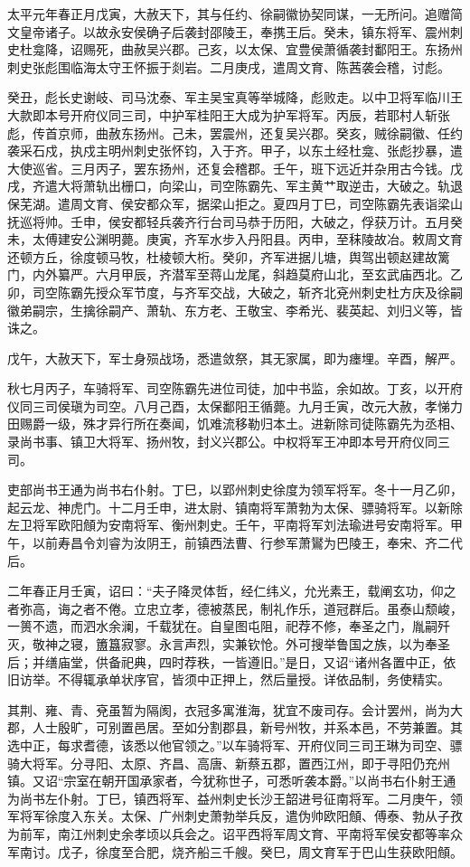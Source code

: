 \documentclass[12pt,UTF8]{ctexbook}
\begin{document}
太平元年春正月戊寅，大赦天下，其与任约、徐嗣徽协契同谋，一无所问。追赠简文皇帝诸子。以故永安侯确子后袭封邵陵王，奉携王后。癸未，镇东将军、震州刺史杜龛降，诏赐死，曲赦吴兴郡。己亥，以太保、宜豊侯萧循袭封鄱阳王。东扬州刺史张彪围临海太守王怀振于剡岩。二月庚戌，遣周文育、陈茜袭会稽，讨彪。

癸丑，彪长史谢岐、司马沈泰、军主吴宝真等举城降，彪败走。以中卫将军临川王大款即本号开府仪同三司，中护军桂阳王大成为护军将军。丙辰，若耶村人斩张彪，传首京师，曲赦东扬州。己未，罢震州，还复吴兴郡。癸亥，贼徐嗣徽、任约袭采石戍，执戍主明州刺史张怀钧，入于齐。甲子，以东土经杜龛、张彪抄暴，遣大使巡省。三月丙子，罢东扬州，还复会稽郡。壬午，班下远近并杂用古今钱。戊戌，齐遣大将萧轨出栅口，向梁山，司空陈霸先、军主黄{艹取}逆击，大破之。轨退保芜湖。遣周文育、侯安都众军，据梁山拒之。夏四月丁巳，司空陈霸先表诣梁山抚巡将帅。壬申，侯安都轻兵袭齐行台司马恭于历阳，大破之，俘获万计。五月癸未，太傅建安公渊明薨。庚寅，齐军水步入丹阳县。丙申，至秣陵故冶。敕周文育还顿方丘，徐度顿马牧，杜棱顿大桁。癸卯，齐军进据儿塘，舆驾出顿赵建故篱门，内外纂严。六月甲辰，齐潜军至蒋山龙尾，斜趋莫府山北，至玄武庙西北。乙卯，司空陈霸先授众军节度，与齐军交战，大破之，斩齐北兗州刺史杜方庆及徐嗣徽弟嗣宗，生擒徐嗣产、萧轨、东方老、王敬宝、李希光、裴英起、刘归义等，皆诛之。

戊午，大赦天下，军士身殒战场，悉遣敛祭，其无家属，即为瘗埋。辛酉，解严。

秋七月丙子，车骑将军、司空陈霸先进位司徒，加中书监，余如故。丁亥，以开府仪同三司侯瑱为司空。八月己酉，太保鄱阳王循薨。九月壬寅，改元大赦，孝悌力田赐爵一级，殊才异行所在奏闻，饥难流移勒归本土。进新除司徒陈霸先为丞相、录尚书事、镇卫大将军、扬州牧，封义兴郡公。中权将军王冲即本号开府仪同三司。

吏部尚书王通为尚书右仆射。丁巳，以郢州刺史徐度为领军将军。冬十一月乙卯，起云龙、神虎门。十二月壬申，进太尉、镇南将军萧勃为太保、骠骑将军。以新除左卫将军欧阳頠为安南将军、衡州刺史。壬午，平南将军刘法瑜进号安南将军。甲午，以前寿昌令刘睿为汝阴王，前镇西法曹、行参军萧鸑为巴陵王，奉宋、齐二代后。

二年春正月壬寅，诏曰：“夫子降灵体哲，经仁纬义，允光素王，载阐玄功，仰之者弥高，诲之者不倦。立忠立孝，德被蒸民，制礼作乐，道冠群后。虽泰山颓峻，一篑不遗，而泗水余澜，千载犹在。自皇图屯阻，祀荐不修，奉圣之门，胤嗣歼灭，敬神之寝，簠簋寂寥。永言声烈，实兼钦怆。外可搜举鲁国之族，以为奉圣后；并缮庙堂，供备祀典，四时荐秩，一皆遵旧。”是日，又诏“诸州各置中正，依旧访举。不得辄承单状序官，皆须中正押上，然后量授。详依品制，务使精实。

其荆、雍、青、兗虽暂为隔阂，衣冠多寓淮海，犹宜不废司存。会计罢州，尚为大郡，人士殷旷，可别置邑居。至如分割郡县，新号州牧，并系本邑，不劳兼置。其选中正，每求耆德，该悉以他官领之。”以车骑将军、开府仪同三司王琳为司空、骠骑大将军。分寻阳、太原、齐昌、高唐、新蔡五郡，置西江州，即于寻阳仍充州镇。又诏“宗室在朝开国承家者，今犹称世子，可悉听袭本爵。”以尚书右仆射王通为尚书左仆射。丁巳，镇西将军、益州刺史长沙王韶进号征南将军。二月庚午，领军将军徐度入东关。太保、广州刺史萧勃举兵反，遣伪帅欧阳頠、傅泰、勃从子孜为前军，南江州刺史余孝顷以兵会之。诏平西将军周文育、平南将军侯安都等率众军南讨。戊子，徐度至合肥，烧齐船三千艘。癸巳，周文育军于巴山生获欧阳頠。
\end{document}
